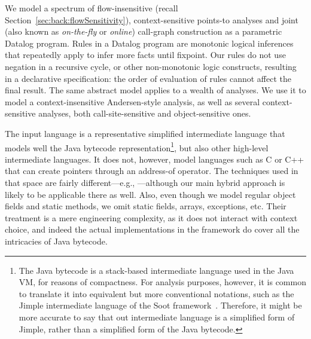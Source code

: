 We model a spectrum of flow-insensitive (recall Section~\ref{sec:back:flowSensitivity}), context-sensitive points-to analyses and joint (also known as \emph{on-the-fly} or \emph{online}) call-graph construction as a parametric Datalog program. Rules in a Datalog program are monotonic logical inferences that repeatedly apply to infer more facts until fixpoint. Our rules do not use negation in a recursive cycle, or other non-monotonic logic constructs, resulting in a declarative specification: the order of evaluation of rules cannot affect the final result. The same abstract model applies to a wealth of analyses. We use it to model a context-insensitive Andersen-style \cite{thesis:Andersen} analysis, as well as several context-sensitive analyses, both call-site-sensitive and object-sensitive ones.

The input language is a representative simplified intermediate language that models well the Java bytecode representation\footnote{The Java bytecode is a stack-based intermediate language used in the Java VM, for reasons of compactness. For analysis purposes, however, it is common to translate it into equivalent but more conventional notations, such as the Jimple intermediate language of the Soot framework~\cite{cascon:1999:Vall,cc:2000:Vall}. Therefore, it might be more accurate to say that out intermediate language is a simplified form of Jimple, rather than a simplified form of the Java bytecode.}, but also other high-level intermediate languages. It does not, however, model languages such as C or C++ that can create pointers through an address-of operator. The techniques used in that space are fairly different---e.g., \cite{pldi:2007:Hardekopf,popl:2009:Hardekopf}---although our main hybrid approach is likely to be applicable there as well. Also, even though we model regular object fields and static methods, we omit static fields, arrays, exceptions, etc. Their treatment is a mere engineering complexity, as it does not interact with context choice, and indeed the actual implementations in the \doop{} framework do cover all the intricacies of Java bytecode.

